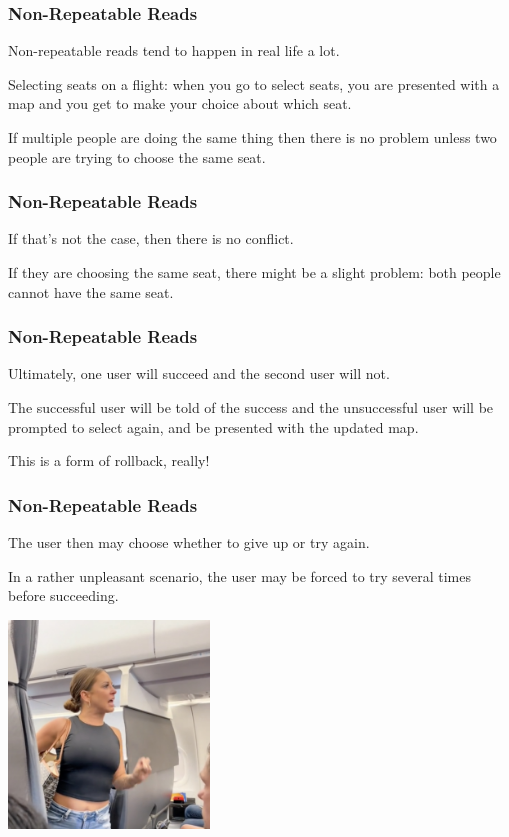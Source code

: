 \begin{frame}
\frametitle{Non-Repeatable Reads}

Non-repeatable reads tend to happen in real life a lot.

Selecting seats on a flight: when you go to select seats, you are presented with a map and you get to make your choice about which seat. 

If multiple people are doing the same thing then there is no problem unless two people are trying to choose the same seat.

\end{frame}

\begin{frame}
\frametitle{Non-Repeatable Reads}


If that's not the case, then there is no conflict. 

If they are choosing the same seat, there might be a slight problem: both people cannot have the same seat.


\end{frame}

\begin{frame}
\frametitle{Non-Repeatable Reads}

Ultimately, one user will succeed and the second user will not. 

The successful user will be told of the success and the unsuccessful user will be prompted to select again, and be presented with the updated map. 

This is a form of rollback, really!


\end{frame}

\begin{frame}
\frametitle{Non-Repeatable Reads}


The user then may choose whether to give up or try again. 

In a rather unpleasant scenario, the user may be forced to try several times before succeeding.

\begin{center}
	\includegraphics[width=0.4\textwidth]{images/seatconflict.jpg}
\end{center}

\end{frame}

